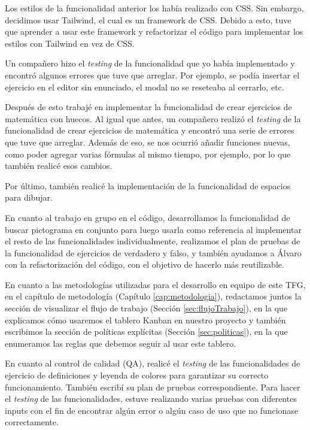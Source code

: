 Los estilos de la funcionalidad anterior los había realizado con CSS. Sin embargo, decidimos usar Tailwind, el cual es un framework de CSS. Debido a esto, tuve que aprender a usar este framework y refactorizar el código para implementar los estilos con Tailwind en vez de CSS.

Un compañero hizo el \textit{testing} de la funcionalidad que yo había implementado y encontró algunos errores que tuve que arreglar. Por ejemplo, se podía insertar el ejercicio en el editor sin enunciado, el modal no se reseteaba al cerrarlo, etc.

Después de esto trabajé en implementar la funcionalidad de crear ejercicios de matemática con huecos. Al igual que antes, un compañero realizó el \textit{testing} de la funcionalidad de crear ejercicios de matemática y encontró una serie de errores que tuve que arreglar. Además de eso, se nos ocurrió añadir funciones nuevas, como poder agregar varias fórmulas al mismo tiempo, por ejemplo, por lo que también realicé esos cambios.

Por último, también realicé la implementación de la funcionalidad de espacios para dibujar.

En cuanto al trabajo en grupo en el código, desarrollamos la funcionalidad de buscar pictograma en conjunto para luego usarla como referencia al implementar el resto de las funcionalidades individualmente, realizamos el plan de pruebas de la funcionalidad de ejercicios de verdadero y falso, y también ayudamos a Álvaro con la refactorización del código, con el objetivo de hacerlo más reutilizable.

En cuanto a las metodologías utilizadas para el desarrollo en equipo de este TFG, en el capítulo de metodología (Capítulo \ref{cap:metodologia}), redactamos juntos la sección de visualizar el flujo de trabajo (Sección \ref{sec:flujoTrabajo}), en la que explicamos cómo usaremos el tablero Kanban en nuestro proyecto y también escribimos la sección de políticas explícitas (Sección \ref{sec:politicas}), en la que enumeramos las reglas que debemos seguir al usar este tablero.

En cuanto al control de calidad (QA), realicé el \textit{testing} de las funcionalidades de ejercicio de definiciones y leyenda de colores para garantizar su correcto funcionamiento. También escribí su plan de pruebas correspondiente. Para hacer el \textit{testing} de las funcionalidades, estuve realizando varias pruebas con diferentes inputs con el fin de encontrar algún error o algún caso de uso que no funcionase correctamente.

